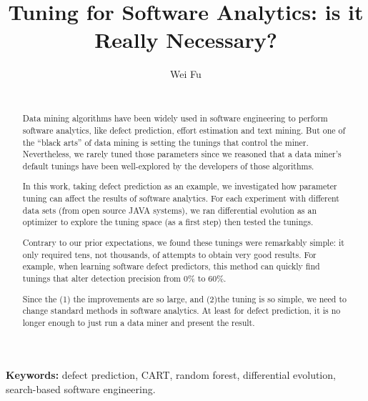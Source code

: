 \documentclass{sig-alternative}
\begin{document}
\title{ Tuning for Software Analytics: is it Really Necessary?}
\author{
       \alignauthor Wei Fu \\
       \\
              }
\maketitle
\pagestyle{plain}

\begin{abstract}
Data mining algorithms have been widely used in software engineering to perform software 
analytics, like defect
prediction, effort estimation and text mining. But one of the  ``black arts'' of data mining is setting
the tunings that control the miner. Nevertheless, we rarely tuned those parameters since we
reasoned that a data miner's default tunings have been well-explored by the developers of
those algorithms.

In this work, taking defect prediction as an example, we investigated how parameter tuning can
affect the results of software analytics. For each experiment with different data sets (from open
source JAVA systems), we ran differential evolution as an optimizer to explore the tuning space
(as a first step) then tested the tunings.

Contrary to our prior expectations, we found these tunings were remarkably simple: it only
required tens, not thousands, of attempts to obtain very good results. For example, when
learning software defect predictors, this method can quickly find tunings that alter detection
precision from 0\% to 60\%.

Since the (1) the improvements are so large, and (2)the tuning is so simple, we need to change
standard methods in software analytics. At least for defect prediction, it is no longer enough to
just run a data miner and present the result.

\end{abstract}

\vspace{1mm}
\noindent
{\bf Keywords:} defect prediction, CART, random forest,
differential evolution,
search-based software engineering.
{} %
\end{document}
